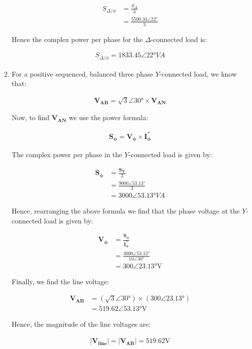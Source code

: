\documentclass{article}
\begin{document}
\begin{enumerate}
		\begin{align*}
			S_{\Delta/\phi} &= \frac{S_\Delta}{3} \\
			&= \frac{5500.34 \angle 22 \si{\degree}}{3}
		\end{align*}
		
		Hence the complex power per phase for the $\Delta$-connected load is:
		
		\begin{align*}
			S_{\Delta/\phi} = 1833.45 \angle 22 \si{\degree} \si{VA}
		\end{align*}
	
	\item
		For a positive sequenced, balanced three phase $Y$-connected load, we know that:
		
		\begin{align*}
			\boldsymbol{V_{AB}} = \sqrt{3}\angle 30 \si{\degree} \times \boldsymbol{V_{AN}}
		\end{align*}
		
		Now, to find $\boldsymbol{V_{AN}}$ we use the power formula:
		
		\begin{align*}
			\boldsymbol{S_\phi} = \boldsymbol{V_\phi} \times \boldsymbol{I_\phi^*}
		\end{align*}
		
		The complex power per phase in the $Y$-connected load is given by:
		
		\begin{align*}
			\boldsymbol{S_\phi} &= \frac{\boldsymbol{S_Y}}{3} \\
			&= \frac{9000 \angle 53.13 \si{\degree}}{3} \\
			&= 3000 \angle 53.13 \si{\degree} \si{VA}
		\end{align*}
		
		Hence, rearranging the above formula we find that the phase voltage at the $Y$-connected load is given by:
		
		\begin{align*}
			\boldsymbol{V_\phi} &= \frac{\boldsymbol{S_\phi}}{\boldsymbol{I_\phi^*}} \\
			&= \frac{3000 \angle 53.13 \si{\degree}}{10 \angle 30 \si{\degree}} \\
			&= 300 \angle 23.13 \si{\degree} \si{\volt}
		\end{align*}
		
		Finally, we find the line voltage:
		
		\begin{align*}
			\boldsymbol{V_{AB}} &= (\sqrt{3} \angle 30 \si{\degree}) \times (300 \angle 23.13 \si{\degree}) \\
			&= 519.62 \angle 53.13 \si{\degree} \si{\volt}
		\end{align*}
		
		Hence, the magnitude of the line voltages are:
		
		\begin{align*}
			|\boldsymbol{V_{line}}| = |\boldsymbol{V_{AB}}| = 519.62 \si{\volt}
		\end{align*}
		
\end{enumerate}
\end{document}
